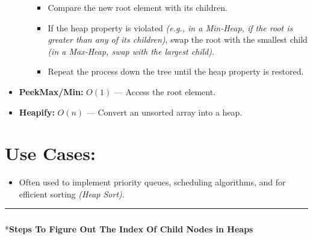 \documentclass[
  letterpaper,
  DIV=11,
  numbers=noendperiod]{scrreprt}
\makeatletter
\let\oldsubparagraph\subparagraph
\renewcommand{\subparagraph}{
    \@ifstar
      \xxxSubParagraphStar
      \xxxSubParagraphNoStar
  }
\newcommand{\xxxSubParagraphStar}[1]{\oldsubparagraph*{#1}\mbox{}}
\newcommand{\xxxSubParagraphNoStar}[1]{\oldsubparagraph{#1}\mbox{}}
\providecommand{\tightlist}{%
  \setlength{\itemsep}{0pt}\setlength{\parskip}{0pt}}
\makeatother
\begin{document}
\begin{itemize}
\begin{itemize}
    \begin{itemize}
    \tightlist
    \item
      Compare the new root element with its children.
    \item
      If the heap property is violated \emph{(e.g., in a Min-Heap, if
      the root is greater than any of its children)}, swap the root with
      the smallest child \emph{(in a Max-Heap, swap with the largest
      child)}.
    \item
      Repeat the process down the tree until the heap property is
      restored.
    \end{itemize}
  \end{itemize}
\item
  \textbf{PeekMax/Min:} \(O(1)\) --- Access the root element.
\item
  \textbf{Heapify:} \(O(n)\) --- Convert an unsorted array into a heap.
\end{itemize}

\section{Use Cases:}

\begin{itemize}
\tightlist
\item
  Often used to implement priority queues, scheduling algorithms, and
  for efficient sorting \emph{(Heap Sort)}.
\end{itemize}

\begin{center}\rule{0.5\linewidth}{0.5pt}\end{center}

\subparagraph*{\texorpdfstring{\textbf{Steps To Figure Out The Index Of
Child Nodes in
Heaps}}{Steps To Figure Out The Index Of Child Nodes in Heaps}}\label{steps-to-figure-out-the-index-of-child-nodes-in-heaps}
\end{document}
